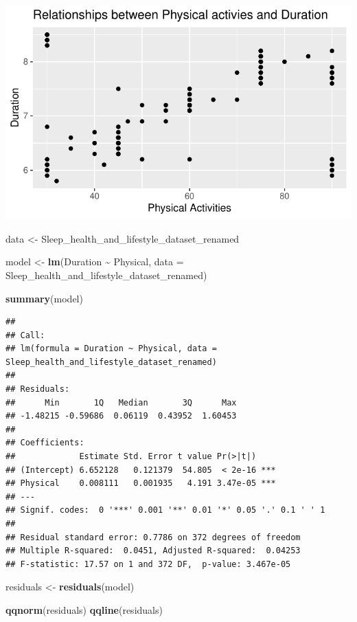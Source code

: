 \documentclass[
  11pt,
]{article}
\newenvironment{Shaded}{\begin{snugshade}}{\end{snugshade}}
\newcommand{\AttributeTok}[1]{\textcolor[rgb]{0.13,0.29,0.53}{#1}}
\newcommand{\FunctionTok}[1]{\textcolor[rgb]{0.13,0.29,0.53}{\textbf{#1}}}
\newcommand{\NormalTok}[1]{#1}
\newcommand{\OtherTok}[1]{\textcolor[rgb]{0.56,0.35,0.01}{#1}}
\newcommand{\SpecialCharTok}[1]{\textcolor[rgb]{0.81,0.36,0.00}{\textbf{#1}}}
\begin{document}
\begin{center}\includegraphics[width=0.7\linewidth]{SleepHelath_files/figure-latex/unnamed-chunk-24-1} \end{center}

\begin{Shaded}
\begin{Highlighting}[]
\NormalTok{data }\OtherTok{\textless{}{-}}\NormalTok{ Sleep\_health\_and\_lifestyle\_dataset\_renamed}

\NormalTok{model }\OtherTok{\textless{}{-}} \FunctionTok{lm}\NormalTok{(Duration }\SpecialCharTok{\textasciitilde{}}\NormalTok{ Physical, }\AttributeTok{data =}\NormalTok{ Sleep\_health\_and\_lifestyle\_dataset\_renamed)}


\FunctionTok{summary}\NormalTok{(model)}
\end{Highlighting}
\end{Shaded}

\begin{verbatim}
## 
## Call:
## lm(formula = Duration ~ Physical, data = Sleep_health_and_lifestyle_dataset_renamed)
## 
## Residuals:
##      Min       1Q   Median       3Q      Max 
## -1.48215 -0.59686  0.06119  0.43952  1.60453 
## 
## Coefficients:
##             Estimate Std. Error t value Pr(>|t|)    
## (Intercept) 6.652128   0.121379  54.805  < 2e-16 ***
## Physical    0.008111   0.001935   4.191 3.47e-05 ***
## ---
## Signif. codes:  0 '***' 0.001 '**' 0.01 '*' 0.05 '.' 0.1 ' ' 1
## 
## Residual standard error: 0.7786 on 372 degrees of freedom
## Multiple R-squared:  0.0451, Adjusted R-squared:  0.04253 
## F-statistic: 17.57 on 1 and 372 DF,  p-value: 3.467e-05
\end{verbatim}

\begin{Shaded}
\begin{Highlighting}[]
\NormalTok{residuals }\OtherTok{\textless{}{-}} \FunctionTok{residuals}\NormalTok{(model)}

\FunctionTok{qqnorm}\NormalTok{(residuals)}
\FunctionTok{qqline}\NormalTok{(residuals)}
\end{Highlighting}
\end{Shaded}
\end{document}

